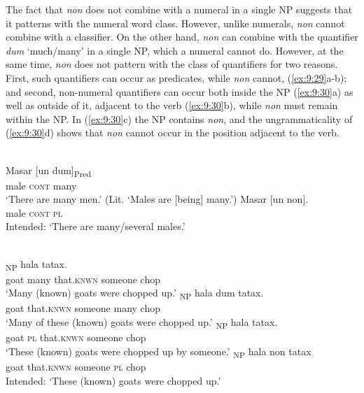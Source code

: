 The fact that \textit{non} does not combine with a numeral in a single NP suggests that it patterns with the numeral word class. However, unlike numerals, \textit{non} cannot combine with a classifier. On the other hand, \textit{non} can combine with the quantifier \textit{dum} `much/many' in a single NP, which a numeral cannot do. However, at the same time, \textit{non} does not pattern with the class of quantifiers for two reasons. First, such quantifiers can occur as predicates, while \textit{non} cannot, (\ref{ex:9:29}a-b); and second, non-numeral quantifiers can occur both inside the NP (\ref{ex:9:30}a) as well as outside of it, adjacent to the verb (\ref{ex:9:30}b), while \textit{non} must remain within the NP. In (\ref{ex:9:30}c) the NP contains \textit{non}, and the ungrammaticality of (\ref{ex:9:30}d) shows that \textit{non} cannot occur in the position adjacent to the verb.


\ea%
\label{ex:9:29}
 \\
\ea
\gll Masar [un dum]\textsubscript{Pred} \\
    male \textsc{cont} many \\
\glt  `There are many men.' (Lit. `Males are [being] many.')
\ex
\gll *Masar [un non]{.} \\
   male \textsc{cont} \textsc{pl}  \\
\glt  Intended: `There are many/several males.'
\z
\z







\ea%
\label{ex:9:30}
 \\
\ea
{}\textsubscript{NP} hala tatax. \\
   goat many that.\textsc{knwn} someone chop  \\
 \glt `Many (known) goats were chopped up.'
\ex
{}\textsubscript{NP} hala dum tatax. \\
   goat that.\textsc{knwn} someone many chop  \\
\glt `Many of these (known) goats were chopped up.'
\ex
{}\textsubscript{NP} hala tatax. \\
   goat \textsc{pl} that.\textsc{knwn} someone chop  \\
\glt  `These (known) goats were chopped up by someone.'
\ex
{}\textsubscript{NP} hala non tatax \\
   goat that.\textsc{knwn} someone \textsc{pl} chop  \\
\glt  Intended: `These (known) goats were chopped up.'
\z
\z


